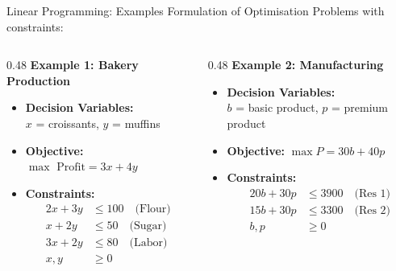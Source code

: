 \documentclass{beamer}
\begin{document}
\begin{frame}{Linear Programming: Examples}
Formulation of Optimisation Problems with constraints:

\vspace{0.3cm}
\begin{columns}[T]
\begin{column}{0.48\textwidth}
\textbf{Example 1: Bakery Production}
\begin{itemize}
    \item \textbf{Decision Variables:} \\ $x$ = croissants, $y$ = muffins
    \item \textbf{Objective:} $\max \text{ Profit} = 3x + 4y$
    \item \textbf{Constraints:}
    \[
    \begin{aligned}
    2x + 3y &\leq 100 \quad \text{(Flour)}\\
    x + 2y &\leq 50 \quad \text{(Sugar)}\\
    3x + 2y &\leq 80 \quad \text{(Labor)}\\
    x, y &\geq 0
    \end{aligned}
    \]
\end{itemize}
\end{column}


\begin{column}{0.48\textwidth}
\textbf{Example 2: Manufacturing}
\begin{itemize}
    \item \textbf{Decision Variables:} \\ $b$ = basic product, $p$ = premium product
    \item \textbf{Objective:} $\max P = 30b + 40p$
    \item \textbf{Constraints:}
    \[
    \begin{aligned}
    20b + 30p &\leq 3900 \quad \text{(Res 1)}\\
    15b + 30p &\leq 3300 \quad \text{(Res 2)}\\
    b, p &\geq 0
    \end{aligned}
    \]
\end{itemize}
\end{column}
\end{columns}
\end{frame}
\end{document}
